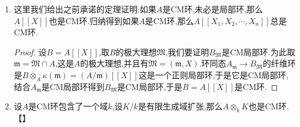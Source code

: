 \begin{enumerate}
\begin{proof}
    	在上述定理中取$M=A$和$N=B$直接得到第一条.在条件下有维数等式$\dim B=\dim A+\dim F$,于是$\dim B-\mathrm{depth}(B)=(\dim A-\mathrm{depth}(A))+(\dim F-\mathrm{depth}(F))$.按照深度不超过维数,说明$B$是CM环当且仅当左侧为0,当且仅当右侧为0,当且仅当$A$和$F$都是CM环.
    \end{proof}
    \item 这里我们给出之前承诺的定理证明:如果$A$是CM环,未必是局部环,那么$A[[X]]$也是CM环.归纳得到如果$A$是CM环,那么$A[[X_1,X_2,\cdots,X_n]]$总是CM环.
    \begin{proof}
    	
    	设$B=A[[X]]$,取$B$的极大理想$\mathfrak{M}$,我们要证明$B_{\mathfrak{M}}$是CM局部环.为此取$\mathfrak{m}=\mathfrak{M}\cap A$,这是$A$的极大理想,并且有$\mathfrak{M}=(\mathfrak{m},X)$.环同态$A_{\mathfrak{m}}\to B_{\mathfrak{M}}$的纤维环是$B\otimes_A\kappa(\mathfrak{m})=(A/\mathfrak{m})[[X]]$这是一个正则局部环,于是它是CM局部环,结合$A_{\mathfrak{m}}$是CM局部环得到$B_{\mathfrak{M}}$是CM局部环,于是$B=A[[X]]$是CM环.
    \end{proof}
    \item 设$A$是CM环包含了一个域$k$,设$K/k$是有限生成域扩张,那么$A\otimes_kK$也是CM环.【】
\end{enumerate}

